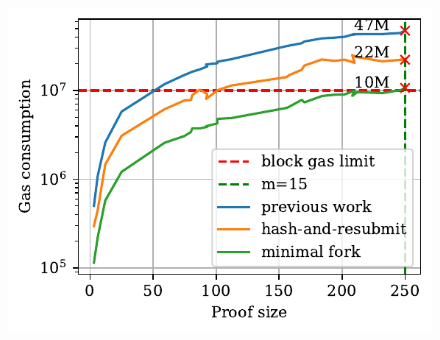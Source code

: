 

\begin{figure}[h]
    \begin{center}
        \includegraphics[width=1\columnwidth]{figures/minimal-fork.pdf}
    \end{center}
    \caption{}
    \label{fig:minimal-fork}
\end{figure}
